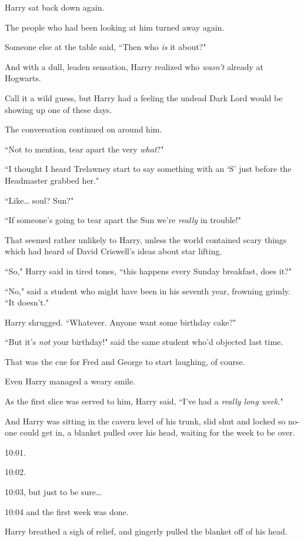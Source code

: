 Harry sat back down again.

The people who had been looking at him turned away again.

Someone else at the table said, ``Then who \emph{is} it about?"

And with a dull, leaden sensation, Harry realized who \emph{wasn't} already at Hogwarts.

Call it a wild guess, but Harry had a feeling the undead Dark Lord would be showing up one of these days.

The conversation continued on around him.

``Not to mention, tear apart the very \emph{what}?"

``I thought I heard Trelawney start to say something with an `S' just before the Headmaster grabbed her."

``Like{\ldots} soul? Sun?"

``If someone's going to tear apart the Sun we're \emph{really} in trouble!"

That seemed rather unlikely to Harry, unless the world contained scary things which had heard of David Criswell's ideas about star lifting.

``So," Harry said in tired tones, ``this happens every Sunday breakfast, does it?"

``No," said a student who might have been in his seventh year, frowning grimly. ``It doesn't."

Harry shrugged. ``Whatever. Anyone want some birthday cake?"

``But it's \emph{not} your birthday!" said the same student who'd objected last time.

That was the cue for Fred and George to start laughing, of course.

Even Harry managed a weary smile.

As the first slice was served to him, Harry said, ``I've had a \emph{really long week}."

\later

And Harry was sitting in the cavern level of his trunk, slid shut and locked so no-one could get in, a blanket pulled over his head, waiting for the week to be over.

10:01.

10:02.

10:03, but just to be sure{\ldots}

10:04 and the first week was done.

Harry breathed a sigh of relief, and gingerly pulled the blanket off of his head.

